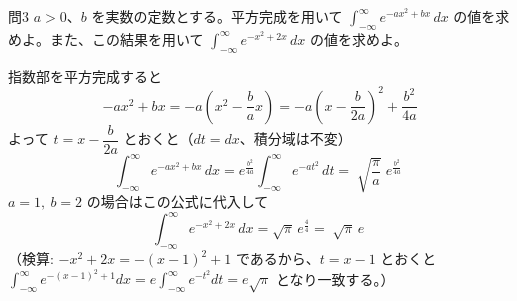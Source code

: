 \documentclass[a4paper,11pt]{article}
\begin{document}
\clearpage
\begin{mondaiboxS}{問3}
$a > 0$、$b$ を実数の定数とする。平方完成を用いて $\displaystyle\int_{-\infty}^{\infty} e^{-a x^{2} + b x}\, dx$ の値を求めよ。また、この結果を用いて $\displaystyle\int_{-\infty}^{\infty} e^{-x^{2} + 2x}\, dx$ の値を求めよ。
\end{mondaiboxS}
\kaitou
指数部を平方完成すると
\[
-a x^{2} + b x = -a\left(x^{2} - \frac{b}{a}x\right)
= -a\left(x - \frac{b}{2a}\right)^{2} + \frac{b^{2}}{4a}
\]
よって $t = x - \dfrac{b}{2a}$ とおくと（$dt = dx$、積分域は不変）
\[
\int_{-\infty}^{\infty} e^{-a x^{2}+bx}\, dx
= e^{\frac{b^{2}}{4a}} \int_{-\infty}^{\infty} e^{-a t^{2}}\, dt
= \boxed{\; \sqrt{\dfrac{\pi}{a}}\; e^{\frac{b^{2}}{4a}} \;}
\]
$a = 1,\ b = 2$ の場合はこの公式に代入して
\[
\int_{-\infty}^{\infty} e^{-x^{2}+2x}\, dx = \sqrt{\pi}\, e^{\frac{4}{4}} = \boxed{\; \sqrt{\pi}\, e \;}
\]
（検算: $-x^2+2x = -(x-1)^2+1$ であるから、$t=x-1$ とおくと $\int_{-\infty}^{\infty}e^{-(x-1)^2+1}dx = e\int_{-\infty}^{\infty}e^{-t^2}dt = e\sqrt{\pi}$ となり一致する。）
\end{document}
